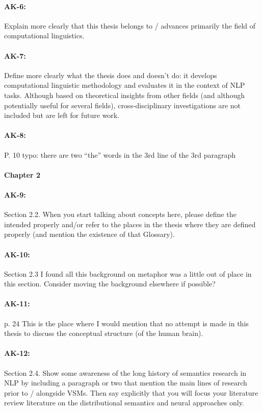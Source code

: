 \documentclass[11pt,a4paper]{article}
\begin{document}
\paragraph{AK-6:} Explain more clearly that this thesis belongs to / advances primarily the field of computational linguistics.

\paragraph{AK-7:} Define more clearly what the thesis does and doesn’t do: it develops computational linguistic methodology and evaluates it in the context of NLP tasks. Although based on theoretical insights from other fields (and although potentially useful for several fields), cross-disciplinary investigations are not included but are left for future work.

\paragraph{AK-8:} P. 10 typo: there are two “the” words in the 3rd line of the 3rd paragraph

\paragraph{Chapter 2}

\paragraph{AK-9:} Section 2.2. When you start talking about concepts here, please define the intended properly and/or refer to the places in the thesis where they are defined properly (and mention the existence of that Glossary).

\paragraph{AK-10:} Section 2.3 I found all this background on metaphor was a little out of place in this section. Consider moving the background elsewhere if possible?

\paragraph{AK-11:} p. 24 This is the place where I would mention that no attempt is made in this thesis to discuss the conceptual structure (of the human brain).

\paragraph{AK-12:} Section 2.4. Show some awareness of the long history of semantics research in NLP by including a paragraph or two that mention the main lines of research prior to / alongside VSMs. Then say explicitly that you will focus your literature review literature on the distributional semantics and neural approaches only.
\end{document}
